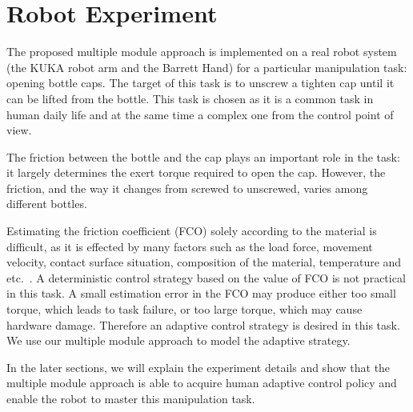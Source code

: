 \section{Robot Experiment}
\label{sec:exp}

The proposed multiple module approach is implemented on a real robot system (the KUKA robot arm and the Barrett Hand) for a particular manipulation task: opening bottle caps. The target of this task is to unscrew a tighten cap until it can be lifted from the bottle.
This task is chosen as it is a common task in human daily life and at the same time a complex one from the control point of view.

The friction between the bottle and the cap plays an important role in the task: it largely determines the exert torque required to open the cap. However, the friction, and the way it changes from screwed to unscrewed, varies among different bottles.

Estimating the friction coefficient (FCO) solely according to the material is difficult, as it is effected by many factors such as the load force, movement velocity, contact surface situation, composition of the material, temperature and etc.~\cite{gustafssoninvestigation}. A deterministic control strategy based on the value of FCO is not practical in this task. A small estimation error in the FCO may produce either too small torque, which leads to task failure, or too large torque, which may cause hardware damage. Therefore an adaptive control strategy is desired in this task. %
We use our multiple module approach to model the adaptive strategy.

In the later sections, we will explain the experiment details and show that the multiple module approach is able to acquire human adaptive control policy and enable the robot to master this manipulation task.

